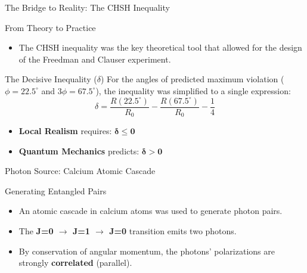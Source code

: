 \begin{frame}{The Bridge to Reality: The CHSH Inequality}
  
  \begin{block}{From Theory to Practice}
    \begin{itemize}[<+->]
      \item The CHSH inequality was the key theoretical tool that allowed for the design of the Freedman and Clauser experiment.
    \end{itemize}
  \end{block}
  
  \begin{alertblock}{The Decisive Inequality ($\delta$)}
    \justifying
    For the angles of predicted maximum violation ($\phi=22.5^\circ$ and $3\phi=67.5^\circ$), the inequality was simplified to a single expression:
    $$ \delta = \frac{R(22.5^\circ)}{R_0} - \frac{R(67.5^\circ)}{R_0} - \frac{1}{4} $$
    \begin{itemize}[<+->]
        \item \textbf{Local Realism} requires: $\boldsymbol{\delta \le 0}$
        \item \textbf{Quantum Mechanics} predicts: $\boldsymbol{\delta > 0}$
    \end{itemize}
  \end{alertblock}

\end{frame}

\begin{frame}{Photon Source: Calcium Atomic Cascade}
  
  \begin{block}{Generating Entangled Pairs}
    \begin{itemize}[<+->]
      \item An atomic cascade in calcium atoms was used to generate photon pairs.
      \item The \textbf{J=0 $\rightarrow$ J=1 $\rightarrow$ J=0} transition emits two photons.
      \item By conservation of angular momentum, the photons' polarizations are strongly \textbf{correlated} (parallel).
    \end{itemize}
  \end{block}

\end{frame}

